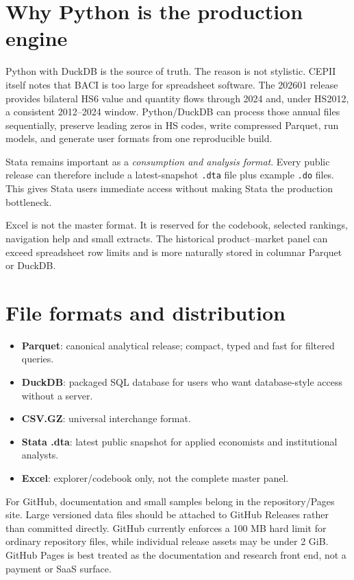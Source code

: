 \documentclass[11pt]{article}
\begin{document}
\section{Why Python is the production engine}
Python with DuckDB is the source of truth. The reason is not stylistic. CEPII itself notes that BACI is too large for spreadsheet software. The 202601 release provides bilateral HS6 value and quantity flows through 2024 and, under HS2012, a consistent 2012--2024 window. Python/DuckDB can process those annual files sequentially, preserve leading zeros in HS codes, write compressed Parquet, run models, and generate user formats from one reproducible build.

Stata remains important as a \emph{consumption and analysis format}. Every public release can therefore include a latest-snapshot \texttt{.dta} file plus example \texttt{.do} files. This gives Stata users immediate access without making Stata the production bottleneck.

Excel is not the master format. It is reserved for the codebook, selected rankings, navigation help and small extracts. The historical product--market panel can exceed spreadsheet row limits and is more naturally stored in columnar Parquet or DuckDB.

\section{File formats and distribution}
\begin{itemize}
\item \textbf{Parquet}: canonical analytical release; compact, typed and fast for filtered queries.
\item \textbf{DuckDB}: packaged SQL database for users who want database-style access without a server.
\item \textbf{CSV.GZ}: universal interchange format.
\item \textbf{Stata .dta}: latest public snapshot for applied economists and institutional analysts.
\item \textbf{Excel}: explorer/codebook only, not the complete master panel.
\end{itemize}

For GitHub, documentation and small samples belong in the repository/Pages site. Large versioned data files should be attached to GitHub Releases rather than committed directly. GitHub currently enforces a 100 MB hard limit for ordinary repository files, while individual release assets may be under 2 GiB. GitHub Pages is best treated as the documentation and research front end, not a payment or SaaS surface.
\end{document}
